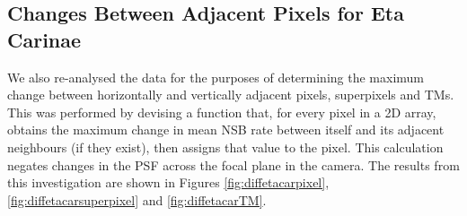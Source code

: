 \subsection{Changes Between Adjacent Pixels for Eta Carinae}
\label{sec:etacarajacent}

We also re-analysed the data for the purposes of determining the maximum change between horizontally and vertically adjacent pixels, superpixels and TMs.
This was performed by devising a function that, for every pixel in a 2D array, obtains the maximum change in mean NSB rate between itself and its adjacent neighbours (if they exist), then assigns that value to the pixel. This calculation negates changes in the PSF across the focal plane in the camera. The results from this investigation are shown in Figures \ref{fig:diffetacarpixel}, \ref{fig:diffetacarsuperpixel} and \ref{fig:diffetacarTM}.



